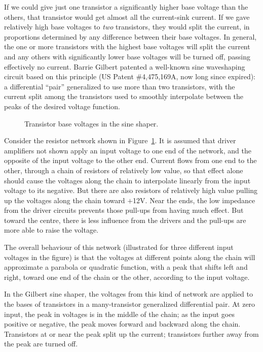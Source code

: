 If we could give just one transistor a significantly higher base voltage
than the others, that transistor would get almost all the current-sink
current.  If we gave relatively high base voltages to \emph{two}
transistors, they would split the current, in proportions determined by any
difference between their base voltages.  In general, the one or more
transistors with the highest base voltages will split the current and any
others with significantly lower base voltages will be turned off, passing
effectively no current.  Barrie Gilbert patented a well-known sine
waveshaping circuit based on this principle (US Patent \#4,475,169A, now
long since expired): a differential ``pair'' generalized to use more than
two transistors, with the current split among the transistors used to
smoothly interpolate between the peaks of the desired voltage function.

\begin{figure}
\centering\par
\caption{Transistor base voltages in the sine shaper.}\label{fig:parabolas}
\end{figure}

Consider the resistor network shown in Figure~\ref{fig:parabolas}.  It is
assumed that driver amplifiers not shown apply an input voltage to one
end of the network, and the opposite of the input voltage to the other end. 
Current flows from one end to the other, through a chain of resistors of
relatively low value, so that effect alone should cause the voltages along
the chain to interpolate linearly from the input voltage to its negative. 
But there are also resistors of relatively high value pulling up the
voltages along the chain toward $+$12V.  Near the ends, the low impedance
from the driver circuits prevents those pull-ups from having much effect. 
But toward the centre, there is less influence from the drivers and the
pull-ups are more able to raise the voltage.

The overall behaviour of this network (illustrated for three different input
voltages in the figure) is that the voltages at different points along the
chain will approximate a parabola or quadratic function, with a peak that
shifts left and right, toward one end of the chain or the other, according
to the input voltage.

In the Gilbert sine shaper, the voltages from this kind of network are
applied to the bases of transistors in a many-transistor generalized
differential pair.  At zero input, the peak in voltages is in the middle of
the chain; as the input goes positive or negative, the peak moves forward
and backward along the chain.  Transistors at or near the peak split up the
current; transistors further away from the peak are turned off.

